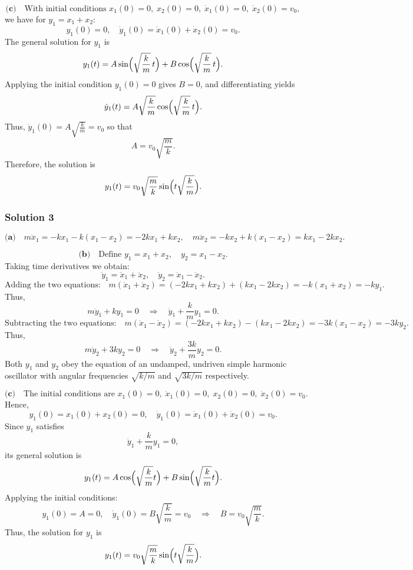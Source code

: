 \documentclass{article}
\begin{document}
\[
\textbf{(c)}\quad \text{With initial conditions } x_1(0)=0,\; x_2(0)=0,\; \dot{x}_1(0)=0,\; \dot{x}_2(0)=v_0,
\]
we have for \( y_1=x_1+x_2 \):
\[
y_1(0)=0,\quad \dot{y}_1(0)=\dot{x}_1(0)+\dot{x}_2(0)=v_0.
\]
The general solution for \( y_1 \) is
\[
y_1(t)=A\sin\Bigl(\sqrt{\frac{k}{m}}\,t\Bigr)+B\cos\Bigl(\sqrt{\frac{k}{m}}\,t\Bigr).
\]
Applying the initial condition \( y_1(0)=0 \) gives \( B=0 \), and differentiating yields
\[
\dot{y}_1(t)=A\sqrt{\frac{k}{m}}\cos\Bigl(\sqrt{\frac{k}{m}}\,t\Bigr).
\]
Thus, \( \dot{y}_1(0)=A\sqrt{\frac{k}{m}}=v_0 \) so that
\[
A=v_0\sqrt{\frac{m}{k}}.
\]
Therefore, the solution is
\[
y_1(t)=v_0\sqrt{\frac{m}{k}}\sin\Bigl(t\sqrt{\frac{k}{m}}\Bigr).
\]


\subsubsection{Solution 3}
\[
\textbf{(a)}\quad m\ddot{x}_1 = -kx_1 - k(x_1 - x_2) = -2kx_1 + kx_2,\quad
m\ddot{x}_2 = -kx_2 + k(x_1 - x_2) = kx_1 - 2kx_2.
\]

\[
\textbf{(b)}\quad \text{Define } y_1 = x_1 + x_2,\quad y_2 = x_1 - x_2.
\]
Taking time derivatives we obtain:
\[
\ddot{y}_1 = \ddot{x}_1 + \ddot{x}_2,\quad \ddot{y}_2 = \ddot{x}_1 - \ddot{x}_2.
\]
\[
\text{Adding the two equations:}\quad m(\ddot{x}_1+\ddot{x}_2) = (-2kx_1+kx_2) + (kx_1-2kx_2) = -k(x_1+x_2) = -ky_1.
\]
Thus,
\[
m\ddot{y}_1 + ky_1 = 0 \quad \Longrightarrow \quad \ddot{y}_1 + \frac{k}{m}y_1 = 0.
\]
\[
\text{Subtracting the two equations:}\quad m(\ddot{x}_1-\ddot{x}_2) = (-2kx_1+kx_2) - (kx_1-2kx_2) = -3k(x_1-x_2) = -3ky_2.
\]
Thus,
\[
m\ddot{y}_2 + 3ky_2 = 0 \quad \Longrightarrow \quad \ddot{y}_2 + \frac{3k}{m}y_2 = 0.
\]
Both \( y_1 \) and \( y_2 \) obey the equation of an undamped, undriven simple harmonic oscillator with angular frequencies \( \sqrt{k/m} \) and \( \sqrt{3k/m} \) respectively.

\[
\textbf{(c)}\quad \text{The initial conditions are } x_1(0)=0,\; \dot{x}_1(0)=0,\; x_2(0)=0,\; \dot{x}_2(0)=v_0.
\]
Hence,
\[
y_1(0)=x_1(0)+x_2(0)=0,\quad \dot{y}_1(0)=\dot{x}_1(0)+\dot{x}_2(0)=v_0.
\]
Since \( y_1 \) satisfies
\[
\ddot{y}_1 + \frac{k}{m}y_1 = 0,
\]
its general solution is
\[
y_1(t)=A\cos\Bigl(\sqrt{\frac{k}{m}}t\Bigr)+B\sin\Bigl(\sqrt{\frac{k}{m}}t\Bigr).
\]
Applying the initial conditions:
\[
y_1(0)=A=0,\quad \dot{y}_1(0)=B\sqrt{\frac{k}{m}}=v_0 \quad \Longrightarrow \quad B=v_0\sqrt{\frac{m}{k}}.
\]
Thus, the solution for \( y_1 \) is
\[
y_1(t)=v_0\sqrt{\frac{m}{k}}\sin\Bigl(t\sqrt{\frac{k}{m}}\Bigr).
\]
\end{document}
